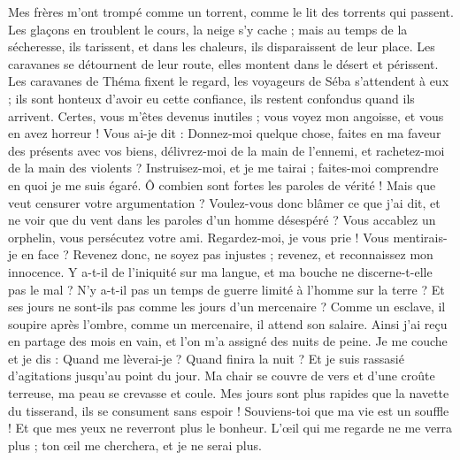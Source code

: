 \begin{multicols}{2}
Mes frères m'ont trompé comme un torrent, comme le lit des torrents qui passent.
Les glaçons en troublent le cours, la neige s'y cache ;
mais au temps de la sécheresse, ils tarissent, et dans les chaleurs, ils disparaissent de leur place.
Les caravanes se détournent de leur route, elles montent dans le désert et périssent.
Les caravanes de Théma fixent le regard, les voyageurs de Séba s’attendent à eux ;
ils sont honteux d'avoir eu cette confiance, ils restent confondus quand ils arrivent.
Certes, vous m'êtes devenus inutiles ; vous voyez mon angoisse, et vous en avez horreur !
Vous ai-je dit : Donnez-moi quelque chose, faites en ma faveur des présents avec vos biens,
délivrez-moi de la main de l'ennemi, et rachetez-moi de la main des violents ?
Instruisez-moi, et je me tairai ; faites-moi comprendre en quoi je me suis égaré.
Ô combien sont fortes les paroles de vérité ! Mais que veut censurer votre argumentation ?
Voulez-vous donc blâmer ce que j'ai dit, et ne voir que du vent dans les paroles d'un homme désespéré ?
Vous accablez un orphelin, vous persécutez votre ami.
Regardez-moi, je vous prie ! Vous mentirais-je en face ?
Revenez donc, ne soyez pas injustes ; revenez, et reconnaissez mon innocence.
Y a-t-il de l'iniquité sur ma langue, et ma bouche ne discerne-t-elle pas le mal ?
\VerseOne{}N'y a-t-il pas un temps de guerre limité à l'homme sur la terre ? Et ses jours ne sont-ils pas comme les jours d'un mercenaire ?
Comme un esclave, il soupire après l'ombre, comme un mercenaire, il attend son salaire.
Ainsi j'ai reçu en partage des mois en vain, et l'on m'a assigné des nuits de peine.
Je me couche et je dis : Quand me lèverai-je ? Quand finira la nuit ? Et je suis rassasié d'agitations jusqu'au point du jour.
Ma chair se couvre de vers et d'une croûte terreuse, ma peau se crevasse et coule.
Mes jours sont plus rapides que la navette du tisserand, ils se consument sans espoir !
Souviens-toi que ma vie est un souffle ! Et que mes yeux ne reverront plus le bonheur.
L'œil qui me regarde ne me verra plus ; ton œil me cherchera, et je ne serai plus.

\end{multicols}
